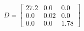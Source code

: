 \documentclass[preview]{standalone}
\begin{document}
\begin{align*}
D=\left[\begin{matrix}27.2&0.0&0.0\\0.0&0.02&0.0\\0.0&0.0&1.78\end{matrix}\right]
\end{align*}
\end{document}
